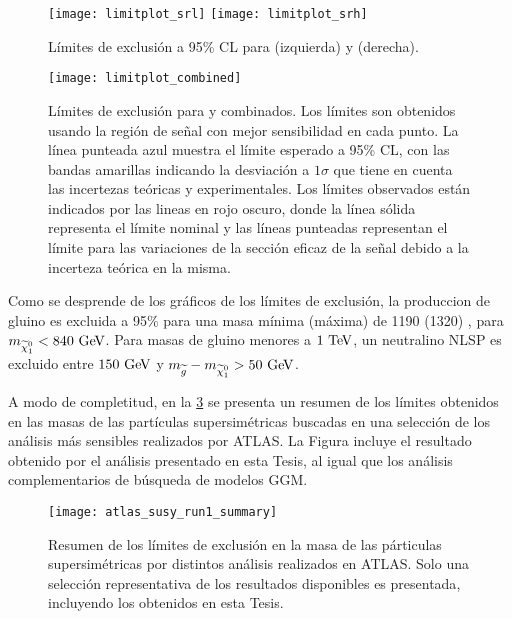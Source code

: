 \begin{figure}[!htb]
  \centering

  \texttt{[image: limitplot\_srl]}
  \texttt{[image: limitplot\_srh]}

  \caption{Límites de exclusión a 95\% CL para {\SRL}  (izquierda) y {\SRH} (derecha).}
  \label{fig:limit_srs}
\end{figure}


\begin{figure}[!htb]
  \centering

  \texttt{[image: limitplot\_combined]}

  \caption{Límites de exclusión para {\SRL} y {\SRH} combinados.
    Los límites son obtenidos usando la región de señal con mejor sensibilidad
    en cada punto.
    La línea punteada azul muestra el límite esperado a 95\% CL, con las bandas amarillas indicando la desviación a
    $1\sigma$ que tiene en cuenta las incertezas teóricas y experimentales. Los
    límites observados están indicados por las lineas en rojo oscuro, donde la línea
    sólida representa el límite nominal y las líneas punteadas representan el límite
    para las variaciones de la sección eficaz de la señal debido a la incerteza
    teórica en la misma.}
   \label{fig:limit_combined}

\end{figure}


Como se desprende de los gráficos de los límites de exclusión, la produccion de
gluino es excluida a 95\% {\cl} para una masa mínima (máxima) de 1190 (1320)
\gev, para $m_{\ninoone}<{840}\gev$. Para masas de gluino menores a $1\tev$, un
neutralino NLSP es excluido entre $150\gev$ y $m_{\gluino}-m_{\ninoone}>50\gev$.

A modo de completitud, en la \cref{fig:susy_summary} se presenta un resumen de los límites obtenidos en
las masas de las partículas supersimétricas buscadas en una selección de los
análisis más sensibles realizados por ATLAS. La Figura incluye el resultado obtenido
por el análisis presentado en esta Tesis, al igual que los análisis
complementarios de búsqueda de modelos GGM. %


\begin{figure}[!htb]
  \centering

  \texttt{[image: atlas\_susy\_run1\_summary]}

  \caption{Resumen de los límites de exclusión en la masa de las párticulas
    supersimétricas por distintos análisis realizados en ATLAS. Solo una
    selección representativa de los resultados disponibles es
    presentada\cite{susy_summary}, incluyendo los obtenidos en esta Tesis.}
  \label{fig:susy_summary}

\end{figure}



